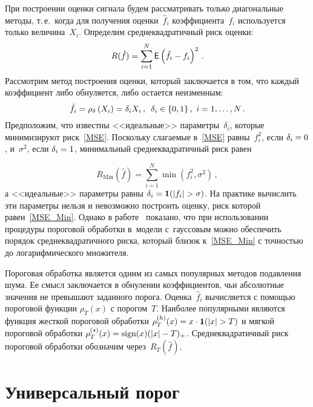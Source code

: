 \begin{multicols}{2}
При построении оценки сигнала будем рас\-смат\-ри\-вать только диагональные методы, 
т.\,е.\ когда для получения оценки~$\hat{f}_i$ коэффициента~$f_i$ используется 
только величина~$X_i$. Определим среднеквадратичный риск оценки:
\begin{equation}
\label{MSE}
R(\hat{f})=\sum\limits_{i=1}^{N}{\sf E}\left(\hat{f}_i-f_i\right)^2\,.
\end{equation}
Рассмотрим метод построения оценки, который заключается в том, 
что каждый коэффициент либо обнуляется, либо остается неизменным:
$$
\hat{f}_i=\rho_\delta\left(X_i\right)=\delta_i X_i\,, \enskip
\delta_i\in\{0,1\}\,,\ i=1,\ldots,N\,.
$$
Предположим, что известны <<идеальные>> па\-ра\-мет\-ры~$\delta_i$, которые 
минимизируют риск~\eqref{MSE}. Поскольку слагаемые в~\eqref{MSE} равны~$f^2_i$, 
если $\delta_i\hm=0$, и~$\sigma^2$, если $\delta_i\hm=1$, минимальный 
среднеквадратичный риск равен

\vspace*{-2pt}

\noindent
\begin{equation}
\label{MSE_Min}
R_{\mathrm{Min}}(\hat{f})=\sum\limits_{i=1}^{N}\min\left(f_i^2,\sigma^2\right)\,,
\end{equation}
а <<идеальные>> параметры равны $\delta_i\hm=\It(\abs{f_i}\hm>\sigma)$. На практике 
вычислить эти параметры нельзя и невозможно построить оценку, риск которой 
равен~\eqref{MSE_Min}. Однако в работе~\cite{DonJ94} показано, что при 
использовании процедуры пороговой обработки в~модели с~гауссовым можно обеспечить 
порядок сред\-не\-квад\-ра\-тич\-но\-го риска, который близок к~\eqref{MSE_Min} с точностью до 
логарифмического множителя.

Пороговая обработка является одним из самых популярных методов подавления шума. 
Ее смысл заключается в обнулении коэффициентов, чьи абсолютные значения не превышают 
заданного порога. Оценка~$\hat{f}_i$ вычисляется с помощью пороговой 
функции $\rho_T(x)$ с порогом~$T$. Наиболее популярными являются функция жесткой 
пороговой обработки $\rho_T^{(h)}(x)\hm=x \cdot\mathbf{1} (|x|>T)$ и мягкой пороговой 
обработки $\rho_T^{(s)}(x)\hm={\mbox{sign}}(x)(|x|-T)_+$. Сред\-не\-квад\-ра\-тич\-ный риск 
пороговой обработки обозначим через~$R_T(\hat{f})$.

\vspace*{-2pt}

\section{Универсальный порог}


\end{multicols}
